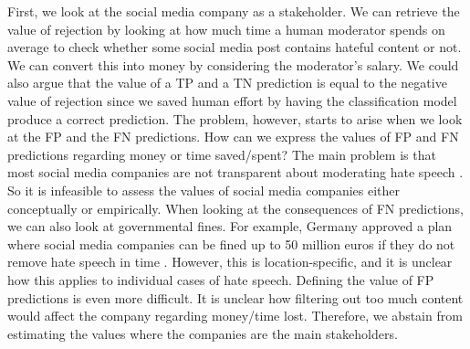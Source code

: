 First, we look at the social media company as a stakeholder.
%
We can retrieve the value of rejection by looking at how much time a human moderator spends on average to check whether some social media post contains hateful content or not.
%
We can convert this into money by considering the moderator's salary.
%
We could also argue that the value of a TP and a TN prediction is equal to the negative value of rejection since we saved human effort by having the classification model produce a correct prediction.
%
The problem, however, starts to arise when we look at the FP and the FN predictions.
%
How can we express the values of FP and FN predictions regarding money or time saved/spent?
%
The main problem is that most social media companies are not transparent about moderating hate speech  \citep{klonick2017new}.
%
So it is infeasible to assess the values of social media companies either conceptually or empirically.
%
When looking at the consequences of FN predictions, we can also look at governmental fines.
%
For example, Germany approved a plan where social media companies can be fined up to 50 million euros if they do not remove hate speech in time \citep{bbc-firms-face-fine-germany}.
%
However, this is location-specific, and it is unclear how this applies to individual cases of hate speech.
%
Defining the value of FP predictions is even more difficult.
%
It is unclear how filtering out too much content would affect the company regarding money/time lost.
%
Therefore, we abstain from estimating the values where the companies are the main stakeholders.

